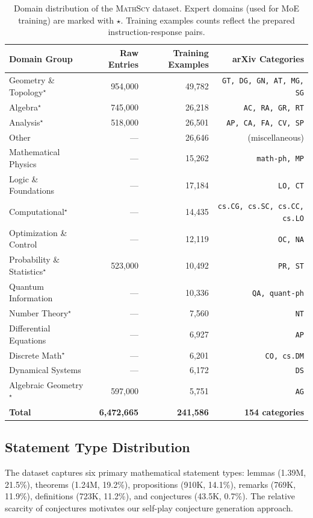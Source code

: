 \documentclass[11pt,a4paper]{article}
\newcommand{\mathscy}{\textsc{MathScy}}
\begin{document}
\begin{table}[t]
\centering
\caption{Domain distribution of the \mathscy{} dataset. Expert domains (used for MoE training) are marked with $\star$. Training examples counts reflect the prepared instruction-response pairs.}
\label{tab:domain_stats}
\small
\begin{tabular}{@{}lrrr@{}}
\toprule
\textbf{Domain Group} & \textbf{Raw Entries} & \textbf{Training Examples} & \textbf{arXiv Categories} \\
\midrule
Geometry \& Topology$^\star$ & 954,000 & 49,782 & \texttt{GT, DG, GN, AT, MG, SG} \\
Algebra$^\star$ & 745,000 & 26,218 & \texttt{AC, RA, GR, RT} \\
Analysis$^\star$ & 518,000 & 26,501 & \texttt{AP, CA, FA, CV, SP} \\
Other & --- & 26,646 & (miscellaneous) \\
Mathematical Physics & --- & 15,262 & \texttt{math-ph, MP} \\
Logic \& Foundations & --- & 17,184 & \texttt{LO, CT} \\
Computational$^\star$ & --- & 14,435 & \texttt{cs.CG, cs.SC, cs.CC, cs.LO} \\
Optimization \& Control & --- & 12,119 & \texttt{OC, NA} \\
Probability \& Statistics$^\star$ & 523,000 & 10,492 & \texttt{PR, ST} \\
Quantum Information & --- & 10,336 & \texttt{QA, quant-ph} \\
Number Theory$^\star$ & --- & 7,560 & \texttt{NT} \\
Differential Equations & --- & 6,927 & \texttt{AP} \\
Discrete Math$^\star$ & --- & 6,201 & \texttt{CO, cs.DM} \\
Dynamical Systems & --- & 6,172 & \texttt{DS} \\
Algebraic Geometry$^\star$ & 597,000 & 5,751 & \texttt{AG} \\
\midrule
\textbf{Total} & \textbf{6,472,665} & \textbf{241,586} & \textbf{154 categories} \\
\bottomrule
\end{tabular}
\end{table}

\subsection{Statement Type Distribution}

The dataset captures six primary mathematical statement types: lemmas (1.39M, 21.5\%), theorems (1.24M, 19.2\%), propositions (910K, 14.1\%), remarks (769K, 11.9\%), definitions (723K, 11.2\%), and conjectures (43.5K, 0.7\%). The relative scarcity of conjectures motivates our self-play conjecture generation approach.
\end{document}
